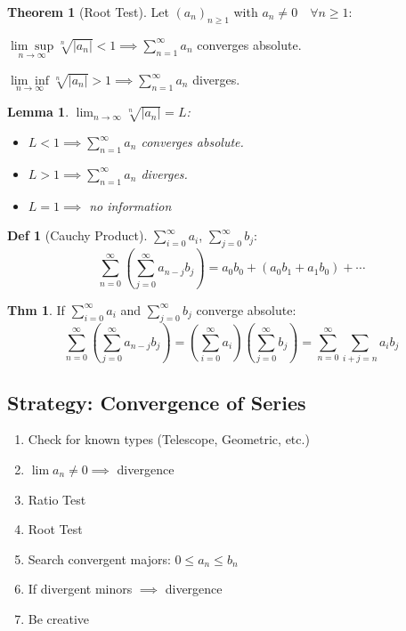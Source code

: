\documentclass[a4paper, 10pt]{article}
\newtheorem*{lemma}{Lemma}
\theoremstyle{definition}
\newtheorem*{theorem}{Thm}
\newtheorem*{definition}{Def}
\theoremstyle{named}
\newtheorem*{ntheorem_wrapper}{Theorem}
\newenvironment{ntheorem}%
    {\begin{mdframed}[style=important]\begin{ntheorem_wrapper}}%
    {\end{ntheorem_wrapper}\end{mdframed}}
\begin{document}
\begin{ntheorem}[Root Test]
    Let $(a_n)_{n \geq 1}$ with $a_n \neq 0 \quad \forall n\geq 1$:

    $\underset{n\to\infty}{\lim\sup} \sqrt[n]{|a_n|} < 1 \implies \sum_{n=1}^\infty a_n$ converges absolute.

    $\underset{n\to\infty}{\lim\inf} \sqrt[n]{|a_n|} > 1 \implies \sum_{n=1}^\infty a_n$ diverges.
\end{ntheorem}

\begin{lemma}
    $\lim_{n\to\infty} \sqrt[n]{|a_n|} = L$:

    \begin{itemize}
        \item $L < 1 \implies \sum_{n=1}^\infty a_n$ converges absolute.
        \item $L > 1 \implies \sum_{n=1}^\infty a_n$ diverges.
        \item $L = 1 \implies$ no information
    \end{itemize}
\end{lemma}

\begin{definition}[Cauchy Product]
    $\sum_{i=0}^\infty a_i$, $\sum_{j=0}^\infty b_j$:
    $$\sum_{n=0}^\infty (\sum_{j=0}^\infty a_{n-j}b_j) = a_0b_0 + (a_0b_1 + a_1b_0) + \cdots$$
\end{definition}

\begin{theorem}
    If $\sum_{i=0}^\infty a_i$ and $\sum_{j=0}^\infty b_j$ converge absolute:
    $$\sum_{n=0}^\infty (\sum_{j=0}^\infty a_{n-j}b_j) = (\sum_{i=0}^\infty a_i) (\sum_{j=0}^\infty b_j) = \sum_{n=0}^\infty \sum_{i+j = n} a_i b_j$$
\end{theorem}

\subsection{Strategy: Convergence of Series}
\begin{enumerate}
    \item Check for known types (Telescope, Geometric, etc.)
    \item $\lim a_n \neq 0 \implies$ divergence
    \item Ratio Test
    \item Root Test
    \item Search convergent majors: $0 \leq a_n \leq b_n$
    \item If divergent minors $\implies$ divergence
    \item Be creative
\end{enumerate}
\end{document}
